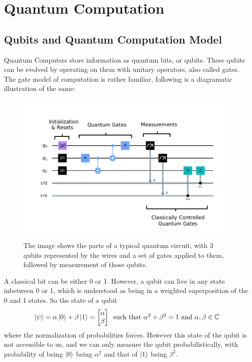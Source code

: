 \section{Quantum Computation}


\subsection{Qubits and Quantum Computation Model}

Quantum Computers store information as quantum bits, or qubits. These qubits can be evolved by operating on them with unitary operators, also called gates. The gate model of computation is rather familiar, following is a diagramatic illustration of the same:

\begin{figure}[h]
    \centering
    \includegraphics[width=0.8\linewidth]{figures/quantum/quantum_circuit_example.png}
    \caption{The image shows the parts of a typical quantum circuit, with 3 qubits represented by the wires and a set of gates applied to them, followed by measurement of those qubits.}
    \label{fig:quantum-circuit-example}
\end{figure}


A classical bit can be either 0 or 1. However, a qubit can live in any state inbetween 0 or 1, which is understood as being in a weighted superposition of the 0 and 1 states. So the state of a qubit 
\begin{equation}
    \ket{\psi} = \alpha \ket{0} + \beta \ket{1} = \begin{bmatrix}\alpha \\ \beta\end{bmatrix} \;\;\text{such that }\alpha^2 + \beta^2 = 1 \text{ and } \alpha, \beta \in \mathbb{C}
\end{equation}
where the normalization of probabilities forces. However this state of the qubit is not accessible to us, and we can only measure the qubit probabilistically, with probability of being $\ket{0}$ being $\alpha^2$ and that of $\ket{1}$ being $\beta^2$.

